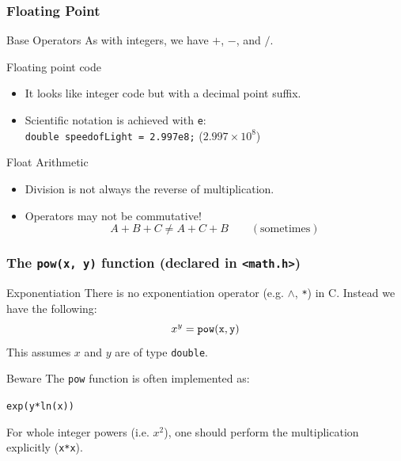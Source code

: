 \documentclass[table]{beamer}
\newif\ifschigh\schighfalse
\newcommand{\kw}[1]{\ifschigh\textcolor{red}{#1}\else\textcolor{keyword}{#1}\fi}
\newcommand{\kt}[1]{\ifschigh\textcolor{red}{#1}\else\textcolor{ctext}{#1}\fi}
\begin{document}
\begin{frame}
\frametitle{Floating Point}
\begin{block}{Base Operators}
As with integers, we have $+$, $-$, {\tt *} and $/$.
\end{block}

\begin{block}{Floating point code}
\begin{itemize}
\item It looks like integer code but with a decimal point suffix.
\item Scientific notation is achieved with {\tt e}:\\
{\tt \kw{double} speedofLight = 2.997e8;} ($2.997 \times 10^8$)
\end{itemize}
\end{block}

\begin{block}{Float Arithmetic}
\begin{itemize}
\item Division is not always the reverse of multiplication.
\item Operators may not be commutative!
$$ A + B + C \neq A + C + B \qquad \mathrm{(sometimes)}$$
\end{itemize}
\end{block}

\end{frame}


\begin{frame}
\frametitle{The {\tt pow(x, y)} function (declared in \kt{\tt <math.h>})}
\begin{block}{Exponentiation}
There is no exponentiation operator (e.g. $\wedge$, {\tt **}) in C. Instead we have the following:
$$x^y = \mathrm{\tt pow(x,y)}$$
This assumes $x$ and $y$ are of type \kw{\tt double}.
\end{block}

\begin{alertblock}{Beware}
The {\tt pow} function is often implemented as:
\begin{center}{\tt exp(y*ln(x))}\end{center}
For whole integer powers (i.e. $x^2$), one should perform the multiplication explicitly ({\tt x*x}).
\end{alertblock}
\end{frame}
\end{document}
